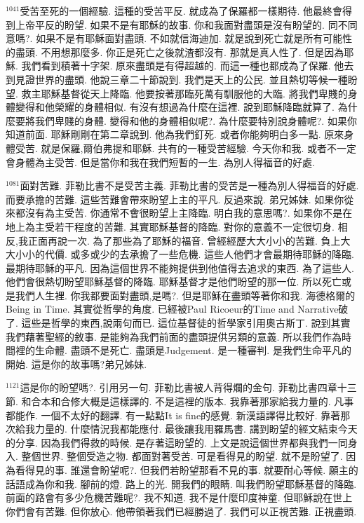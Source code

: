 \documentclass{book}
\begin{document}
$^{1041}$受苦至死的一個經驗.
這種的受苦平反.
就成為了保羅都一樣期待.
他最終會得到上帝平反的盼望.
如果不是有耶穌的故事.
你和我面對盡頭是沒有盼望的.
同不同意嗎?.
如果不是有耶穌面對盡頭.
不如就信海迪加.
就是說到死亡就是所有可能性的盡頭.
不用想那麼多.
你正是死亡之後就渣都沒有.
那就是真人性了.
但是因為耶穌.
我們看到積著十字架.
原來盡頭是有得超越的.
而這一種也都成為了保羅.
他去到見證世界的盡頭.
他說三章二十節說到.
我們是天上的公民.
並且熱切等候一種盼望.
救主耶穌基督從天上降臨.
他要按著那臨死萬有馴服他的大臨.
將我們卑賤的身體變得和他榮耀的身體相似.
有沒有想過為什麼在這裡.
說到耶穌降臨就算了.
為什麼要將我們卑賤的身體.
變得和他的身體相似呢?.
為什麼要特別說身體呢?.
如果你知道前面.
耶穌剛剛在第二章說到.
他為我們釘死.
或者你能夠明白多一點.
原來身體受苦.
就是保羅,爾伯弗提和耶穌.
共有的一種受苦經驗.
今天你和我.
或者不一定會身體為主受苦.
但是當你和我在我們短暫的一生.
為別人得福音的好處.

$^{1081}$面對苦難.
菲勒比書不是受苦主義.
菲勒比書的受苦是一種為別人得福音的好處.
而要承擔的苦難.
這些苦難會帶來盼望上主的平凡.
反過來說.
弟兄姊妹.
如果你從來都沒有為主受苦.
你通常不會很盼望上主降臨.
明白我的意思嗎?.
如果你不是在地上為主受若干程度的苦難.
其實耶穌基督的降臨.
對你的意義不一定很切身.
相反,我正面再說一次.
為了那些為了耶穌的福音.
曾經經歷大大小小的苦難.
負上大大小小的代價.
或多或少的去承擔了一些危機.
這些人他們才會最期待耶穌的降臨.
最期待耶穌的平凡.
因為這個世界不能夠提供到他值得去追求的東西.
為了這些人.
他們會很熱切盼望耶穌基督的降臨.
耶穌基督才是他們盼望的那一位.
所以死亡或是我們人生裡.
你我都要面對盡頭,是嗎?.
但是耶穌在盡頭等著你和我.
海德格爾的Being in Time.
其實從哲學的角度.
已經被Paul Ricoeur的Time and Narrative破了.
這些是哲學的東西,說兩句而已.
這位基督徒的哲學家引用奧古斯丁.
說到其實我們藉著聖經的敘事.
是能夠為我們前面的盡頭提供另類的意義.
所以我們作為時間裡的生命體.
盡頭不是死亡.
盡頭是Judgement.
是一種審判.
是我們生命平凡的開始.
這是你的故事嗎?弟兄姊妹.

$^{1121}$這是你的盼望嗎?.
引用另一句.
菲勒比書被人背得爛的金句.
菲勒比書四章十三節.
和合本和合修大概是這樣譯的.
不是這裡的版本.
我靠著那家給我力量的.
凡事都能作.
一個不太好的翻譯.
有一點點It is fine的感覺.
新漢語譯得比較好.
靠著那次給我力量的.
什麼情況我都能應付.
最後讓我用羅馬書.
講到盼望的經文結束今天的分享.
因為我們得救的時候.
是存著這盼望的.
上文是說這個世界都與我們一同身入.
整個世界.
整個受造之物.
都面對著受苦.
可是看得見的盼望.
就不是盼望了.
因為看得見的事.
誰還會盼望呢?.
但我們若盼望那看不見的事.
就要耐心等候.
願主的話語成為你和我.
腳前的燈.
路上的光.
開我們的眼睛.
叫我們盼望耶穌基督的降臨.
前面的路會有多少危機苦難呢?.
我不知道.
我不是什麼印度神童.
但耶穌說在世上你們會有苦難.
但你放心.
他帶領著我們已經勝過了.
我們可以正視苦難.
正視盡頭.
\end{document}
